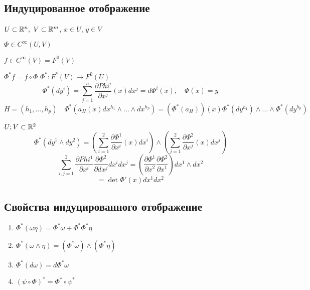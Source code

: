     \subsection*{Индуцированное отображение}

    \par $U \subset \mathbb{R}^n, \ V \subset \mathbb{R}^m$, \quad $x \in U$, $y \in V$
    \par $\Phi \in C^\infty(U, V)$
    \par $f \in C^\infty(V) = F^0(V)$
    \par $\Phi^* f = f \circ \Phi$ \quad $\Phi^* : F^*(V) \rightarrow F^0(U)$
    \[
        \Phi^*(dy^i) = \sum_{j=1}^n \frac{\partial Phi^i}{\partial x^j}(x) dx^j = d \Phi^i(x), \quad \Phi(x) = y
    \]
    \[
        H = (h_1, \dots, h_p) \quad \Phi^*(a_H(x) dx^{h_1} \wedge \dots \wedge dx^{h_p}) = (\Phi^*(a_H))(x) \Phi^*(dy^{h_1}) \wedge \dots \wedge \Phi^*(dy^{h_p})
    \]

    \begin{illustration*}
        $U; V \subset \mathbb{R}^2$
        \[
            \Phi^*(dy^1 \wedge dy^2) = \left( \sum_{i=1}^2 \frac{\partial \Phi^1}{\partial x^i}(x) dx^i \right) \wedge \left( \sum_{j=1}^2 \frac{\partial \Phi^2}{\partial x^j}(x) dx^j \right)    
        \]
        \[
            \sum_{i, j = 1}^2 \frac{\partial Phi^1}{\partial x^i} \frac{\partial \Phi^2}{\partial dx^j} dx^i dx^j = \left( \frac{\partial \Phi^1}{\partial x^2} \frac{\partial \Phi^2}{\partial x^1} \right) dx^1 \wedge dx^2 
        \]
        \[
            = \det \Phi'(x) dx^1 dx^2    
        \]
    \end{illustration*}

    \subsection*{Свойства индуцированного отображение}

    \begin{enumerate}
        \item $\Phi^*(\omega \eta) = \Phi^* \omega + \Phi^* \Phi^* \eta$
        \item $\Phi^*(\omega \wedge \eta) = (\Phi^* \omega) \wedge (\Phi^* \eta)$
        \item $\Phi^*(d\omega) = d \Phi^* \omega$
        \item $(\psi \circ \Phi)^* = \Phi^* \circ \psi^*$
    \end{enumerate}

